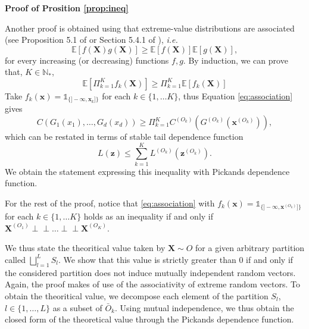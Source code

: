 \documentclass[11pt]{article}
\makeatletter
\theoremstyle{definition}
\renewenvironment{proof}[1][\proofname]{\par
\pushQED{\qed}%
\normalfont \topsep6\p@\@plus6\p@\relax
\trivlist
\item\relax
{\textbf{
#1\@addpunct{ }}}\hspace\labelsep\ignorespaces
}{%
\popQED\endtrivlist\@endpefalse
}
\newcommand{\indep}{\perp \!\!\! \perp}
\makeatother
\begin{document}
\begin{proof}[Proof of Prosition \ref{prop:ineq}]
	Another proof is obtained using that extreme-value distributions are associated (see Proposition 5.1 of \cite{marshall1983} or Section 5.4.1 of \cite{resnick2008extreme}), \emph{i.e.}
	\begin{equation*}
		\mathbb{E}\left[f(\textbf{X}) g(\textbf{X}) \right] \geq \mathbb{E}\left[ f(\textbf{X})\right] \mathbb{E} \left[g(\textbf{X}) \right],
	\end{equation*}
	for every increasing (or decreasing) functions $f,g$. By induction, we can prove that, $K \in \mathbb{N}_*$, 
	\begin{equation}
		\label{eq:association}
		\mathbb{E}\left[\Pi_{k=1}^K f_k(\textbf{X}) \right] \geq \Pi_{k=1}^K \mathbb{E}\left[ f_k(\textbf{X}) \right]
	\end{equation}	
	Take $f_k(\textbf{x}) = \mathds{1}_{\{]-\infty, \textbf{x}_k]\}}$ for each $k \in \{1, \dots K\}$, thus Equation \eqref{eq:association} gives
	\begin{equation*}
		C(G_1(x_1), \dots, G_d(x_d)) \geq \Pi_{k=1}^K C^{(O_k)} \left(G^{(O_k)}\left(\textbf{x}^{(O_k)}\right) \right),
	\end{equation*}
	which can be restated in terms of stable tail dependence function
	\begin{equation*}
		L(\textbf{z}) \leq \sum_{k=1}^K L^{(O_k)}(\textbf{z}^{(O_k)}).
	\end{equation*}
	We obtain the statement expressing this inequality with Pickands dependence function.
	
	For the rest of the proof, notice that \eqref{eq:association} with $f_k(\textbf{x}) = \mathds{1}_{\{]-\infty, \textbf{x}^{(O_k)}]\}}$ for each $k \in \{1, \dots K\}$ holds as an inequality if and only if $\textbf{X}^{(O_1)} \indep \dots \indep \textbf{X}^{(O_K)}$.
	\end{proof}
	
	We thus state the theoritical value taken by $\textbf{X} \sim O$ for a given arbitrary partition called $\bigsqcup_{l=1}^L S_l$. We show that this value is strictly greater than $0$ if and only if the considered partition does not induce mutually independent random vectors. Again, the proof makes of use of the associativity of extreme random vectors. To obtain the theoritical value, we decompose each element of the partition $S_l$, $l \in \{1,\dots,L\}$ as a subset of $\bar{O}_k$. Using mutual independence, we thus obtain the closed form of the theoretical value through the Pickands dependence function.
	
\end{document}

